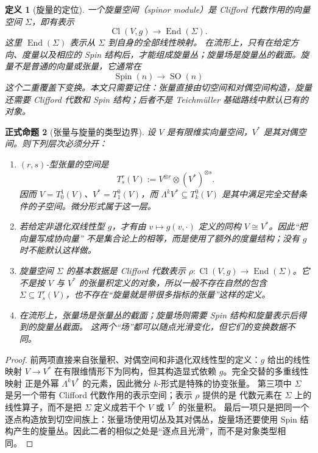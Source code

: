 \documentclass[UTF8,fontset=none,a4paper,11pt]{ctexart}
\theoremstyle{foundation-definition}
\newtheorem{definition}{定义}[section]
\theoremstyle{foundation-theorem}
\theoremstyle{foundation-proposition}
\newtheorem{proposition}[definition]{正式命题}
\theoremstyle{foundation-example}
\theoremstyle{foundation-remark}
\theoremstyle{foundation-theorem}
\begin{document}
\begin{definition}[旋量的定位]\label{def:spinor}
一个旋量空间（spinor module）是 Clifford 代数作用的向量空间 \(\Sigma\)，即有表示
\[
\operatorname{Cl}(V,g)\longrightarrow\operatorname{End}(\Sigma).
\]
这里 \(\operatorname{End}(\Sigma)\) 表示从 \(\Sigma\) 到自身的全部线性映射。
在流形上，只有在给定方向、度量以及相应的 Spin 结构后，才能组成旋量丛；旋量场是旋量丛的截面。旋量不是普通的向量或张量，它通常在
\[
\operatorname{Spin}(n)\longrightarrow\operatorname{SO}(n)
\]
这个二重覆盖下变换。本文只需要记住：张量直接由切空间和对偶空间构造，旋量还需要 Clifford 代数和 Spin 结构；后者不是 Teichmüller 基础路线中默认已有的对象。
\end{definition}

\begin{proposition}[张量与旋量的类型边界]\label{prop:tensor-spinor-type-check}
设 \(V\) 是有限维实向量空间，\(V^*\) 是其对偶空间。则下列层次必须分开：
\begin{enumerate}[label=(\arabic*)]
  \item \((r,s)\)-型张量的空间是
  \[
    T^r_s(V):=V^{\otimes r}\otimes(V^*)^{\otimes s}.
  \]
  因而 \(V=T^1_0(V)\)、\(V^*=T^0_1(V)\)，而 \(\Lambda^kV^*\subseteq T^0_k(V)\)
  是其中满足完全交替条件的子空间。微分形式属于这一层。
  \item 若给定非退化双线性型 \(g\)，才有由
  \(v\mapsto g(v,\mathord\cdot)\) 定义的同构 \(V\cong V^*\)。因此“把向量写成协向量”
  不是集合论上的相等，而是使用了额外的度量结构；没有 \(g\) 时不能默认这样做。
  \item 旋量空间 \(\Sigma\) 的基本数据是 Clifford 代数表示
  \(\rho:\operatorname{Cl}(V,g)\to\operatorname{End}(\Sigma)\)。它不是按
  \(V\) 与 \(V^*\) 的张量积定义的对象，所以一般不存在自然的包含
  \(\Sigma\subseteq T^r_s(V)\)，也不存在“旋量就是带很多指标的张量”这样的定义。
  \item 在流形上，张量场是张量丛的截面；旋量场则需要 Spin 结构和旋量表示后得到的旋量丛截面。
  这两个“场”都可以随点光滑变化，但它们的变换数据不同。
\end{enumerate}
\end{proposition}

\begin{proof}
前两项直接来自张量积、对偶空间和非退化双线性型的定义：\(g\) 给出的线性映射
\(V\to V^*\) 在有限维情形下为同构，但其构造显式依赖 \(g\)。完全交替的多重线性映射
正是外幂 \(\Lambda^kV^*\) 的元素，因此微分 \(k\)-形式是特殊的协变张量。
第三项中 \(\Sigma\) 是另一个带有 Clifford 代数作用的表示空间；表示 \(\rho\) 提供的是
代数元素在 \(\Sigma\) 上的线性算子，而不是把 \(\Sigma\) 定义成若干个 \(V\) 或 \(V^*\) 的张量积。
最后一项只是把同一个逐点构造放到切空间族上：张量场使用切丛及其对偶丛，旋量场还要使用
Spin 结构产生的旋量丛。因此二者的相似之处是“逐点且光滑”，而不是对象类型相同。
\end{proof}
\end{document}
